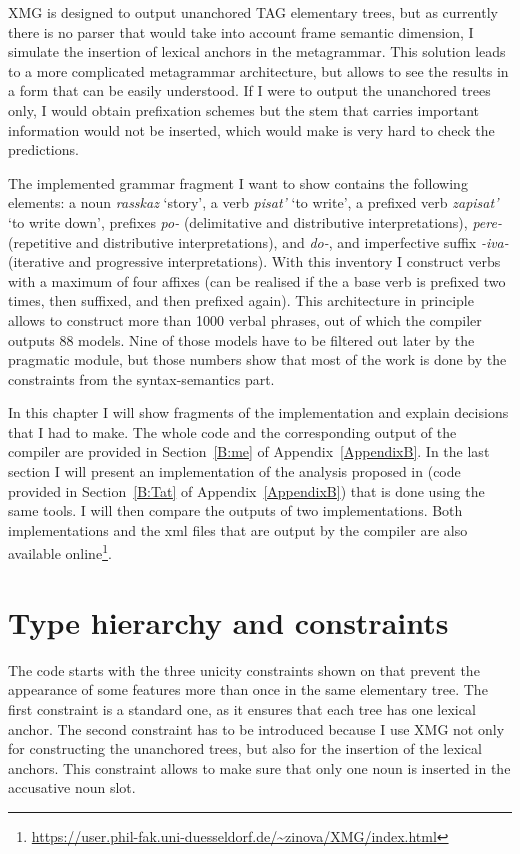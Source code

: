 XMG is designed to output unanchored TAG elementary trees, but as currently there is no parser that would take into account frame semantic dimension, I simulate the insertion of lexical anchors in the metagrammar. This solution leads to a more complicated metagrammar architecture, but allows to see the results in a form that can be easily understood. If I were to output the unanchored trees only, I would obtain prefixation schemes but the stem that carries important information would not be inserted, which would make is very hard to check the predictions. 


The implemented grammar fragment I want to show contains the following elements: a noun \textit{rasskaz} `story', a verb \textit{pisat'} `to write', a prefixed verb \textit{zapisat'} `to write down', prefixes \textit{po-} (delimitative and distributive interpretations), \textit{pere-} (repetitive and distributive interpretations), and \textit{do-}, and imperfective suffix \textit{-iva-} (iterative and progressive interpretations).  With this inventory I construct verbs with a maximum of four affixes (can be realised if the a base verb is prefixed two times, then suffixed, and then prefixed again). This architecture in principle allows to construct more than 1000 verbal phrases, out of which the compiler outputs 88 models. Nine of those models have to be filtered out later by the pragmatic module, but those numbers show that most of the work is done by the constraints from the syntax-semantics part.

In this chapter I will show fragments of the implementation and explain decisions that I had to make. The whole code and the corresponding output of the compiler are provided in Section~\ref{B:me} of Appendix~\ref{AppendixB}. In the last section I will present an implementation of the analysis proposed in \citet{Tatevosov:09} (code provided in Section~\ref{B:Tat} of Appendix~\ref{AppendixB}) that is done using the same tools. I will then compare the outputs of two implementations. Both implementations and the xml files that are output by the compiler are also available online\footnote{\url{https://user.phil-fak.uni-duesseldorf.de/~zinova/XMG/index.html}}.

\section{Type hierarchy and constraints}
The code starts with the three unicity constraints shown on  that prevent the appearance of some features more than once in the same elementary tree. The first constraint is a standard one, as it ensures that each tree has one lexical anchor. The second constraint has to be introduced because I use XMG not only for constructing the unanchored trees, but also for the insertion of the lexical anchors. This constraint allows to make sure that only one noun is inserted in the accusative noun slot.

